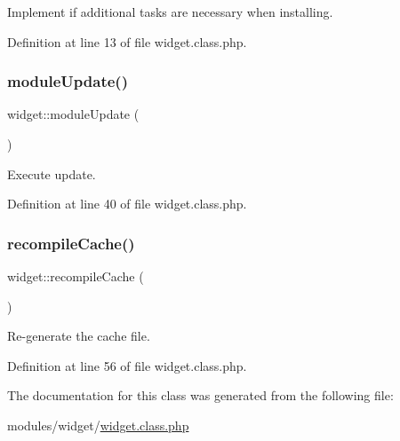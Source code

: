 Implement if additional tasks are necessary when installing. 



Definition at line 13 of file widget.\+class.\+php.

\hypertarget{classwidget_ae12b6e9bc84250539e3aa09c1e1e6f77}{}\label{classwidget_ae12b6e9bc84250539e3aa09c1e1e6f77} 
\subsubsection{\texorpdfstring{module\+Update()}{moduleUpdate()}}
{\footnotesize\ttfamily widget\+::module\+Update (\begin{DoxyParamCaption}{ }\end{DoxyParamCaption})}



Execute update. 



Definition at line 40 of file widget.\+class.\+php.

\hypertarget{classwidget_a958eb4fd79b5c9834f04d866bc6b5d02}{}\label{classwidget_a958eb4fd79b5c9834f04d866bc6b5d02} 
\subsubsection{\texorpdfstring{recompile\+Cache()}{recompileCache()}}
{\footnotesize\ttfamily widget\+::recompile\+Cache (\begin{DoxyParamCaption}{ }\end{DoxyParamCaption})}



Re-\/generate the cache file. 



Definition at line 56 of file widget.\+class.\+php.



The documentation for this class was generated from the following file\+:\begin{DoxyCompactItemize}
\item 
modules/widget/\hyperlink{widget_8class_8php}{widget.\+class.\+php}\end{DoxyCompactItemize}
